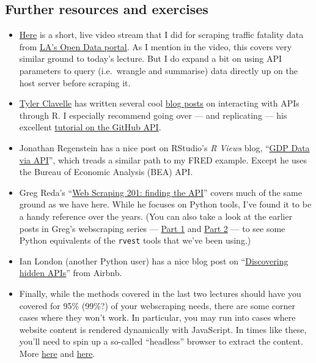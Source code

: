 \documentclass[
]{article}
\begin{document}
\hypertarget{further-resources-and-exercises}{%
\subsection{Further resources and
exercises}\label{further-resources-and-exercises}}

\begin{itemize}
\item
  \href{https://www.pscp.tv/w/1ynKOpVnERrGR}{Here} is a short, live
  video stream that I did for scraping traffic fatality data from
  \href{https://data.lacity.org/}{LA's Open Data portal}. As I mention
  in the video, this covers very similar ground to today's lecture. But
  I do expand a bit on using API parameters to query (i.e.~wrangle and
  summarise) data directly up on the host server before scraping it.
\item
  \href{https://twitter.com/tclavl}{Tyler Clavelle} has written several
  cool \href{https://tclavelle.github.io/blog/}{blog posts} on
  interacting with APIs through R. I especially recommend going over ---
  and replicating --- his excellent
  \href{https://tclavelle.github.io/blog/r_and_apis/}{tutorial on the
  GitHub API}.
\item
  Jonathan Regenstein has a nice post on RStudio's \emph{R Views} blog,
  ``\href{https://rviews.rstudio.com/2018/09/12/gdp-via-api/}{GDP Data
  via API}'', which treads a similar path to my FRED example. Except he
  uses the Bureau of Economic Analysis (BEA) API.
\item
  Greg Reda's
  ``\href{http://www.gregreda.com/2015/02/15/web-scraping-finding-the-api/}{Web
  Scraping 201: finding the API}'' covers much of the same ground as we
  have here. While he focuses on Python tools, I've found it to be a
  handy reference over the years. (You can also take a look at the
  earlier posts in Greg's webscraping series ---
  \href{http://www.gregreda.com/2013/03/03/web-scraping-101-with-python/}{Part
  1} and
  \href{http://www.gregreda.com/2013/04/29/more-web-scraping-with-python/}{Part
  2} --- to see some Python equivalents of the \texttt{rvest} tools that
  we've been using.)
\item
  Ian London (another Python user) has a nice blog post on
  ``\href{https://ianlondon.github.io/blog/web-scraping-discovering-hidden-apis/}{Discovering
  hidden APIs}'' from Airbnb.
\item
  Finally, while the methods covered in the last two lectures should
  have you covered for 95\% (99\%?) of your webscraping needs, there are
  some corner cases where they won't work. In particular, you may run
  into cases where website content is rendered dynamically with
  JavaScript. In times like these, you'll need to spin up a so-called
  ``headless'' browser to extract the content. More
  \href{https://rud.is/b/2017/02/09/diving-into-dynamic-website-content-with-splashr/}{here}
  and
  \href{https://twitter.com/grant_mcdermott/status/1192889722672041984}{here}.
\end{itemize}
\end{document}
